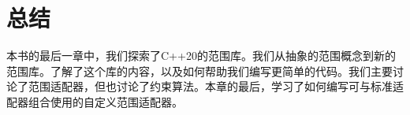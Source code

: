 \section{总结}
本书的最后一章中，我们探索了C++20的范围库。我们从抽象的范围概念到新的范围库。了解了这个库的内容，以及如何帮助我们编写更简单的代码。我们主要讨论了范围适配器，但也讨论了约束算法。本章的最后，学习了如何编写可与标准适配器组合使用的自定义范围适配器。